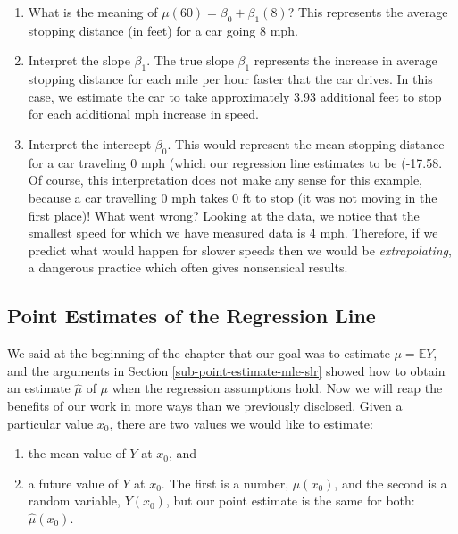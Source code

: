 \documentclass[]{book}
\providecommand{\tightlist}{%
  \setlength{\itemsep}{0pt}\setlength{\parskip}{0pt}}
\numberwithin{equation}{chapter}
\numberwithin{figure}{chapter}
\theoremstyle{plain}
\theoremstyle{definition}
\theoremstyle{remark}
\theoremstyle{definition}
\theoremstyle{definition}
\theoremstyle{remark}
\begin{document}
\begin{enumerate}
\def\labelenumi{\arabic{enumi}.}
\tightlist
\item
  What is the meaning of \(\mu(60) = \beta_{0} + \beta_{1}(8)\)? This
  represents the average stopping distance (in feet) for a car going 8
  mph.
\item
  Interpret the slope \(\beta_{1}\). The true slope \(\beta_{1}\)
  represents the increase in average stopping distance for each mile per
  hour faster that the car drives. In this case, we estimate the car to
  take approximately 3.93 additional feet to stop for each additional
  mph increase in speed.
\item
  Interpret the intercept \(\beta_{0}\). This would represent the mean
  stopping distance for a car traveling 0 mph (which our regression line
  estimates to be (-17.58. Of course, this interpretation does not make
  any sense for this example, because a car travelling 0 mph takes 0 ft
  to stop (it was not moving in the first place)! What went wrong?
  Looking at the data, we notice that the smallest speed for which we
  have measured data is 4 mph. Therefore, if we predict what would
  happen for slower speeds then we would be \emph{extrapolating}, a
  dangerous practice which often gives nonsensical results.
\end{enumerate}

\subsection{Point Estimates of the Regression
Line}\label{sub-slr-point-est-regline}

We said at the beginning of the chapter that our goal was to estimate
\(\mu = \mathbb{E} Y\), and the arguments in Section
\ref{sub-point-estimate-mle-slr} showed how to obtain an estimate
\(\hat{\mu}\) of \(\mu\) when the regression assumptions hold. Now we
will reap the benefits of our work in more ways than we previously
disclosed. Given a particular value \(x_{0}\), there are two values we
would like to estimate:

\begin{enumerate}
\def\labelenumi{\arabic{enumi}.}
\tightlist
\item
  the mean value of \(Y\) at \(x_{0}\), and
\item
  a future value of \(Y\) at \(x_{0}\). The first is a number,
  \(\mu(x_{0})\), and the second is a random variable, \(Y(x_{0})\), but
  our point estimate is the same for both: \(\hat{\mu}(x_{0})\).
\end{enumerate}
\end{document}
